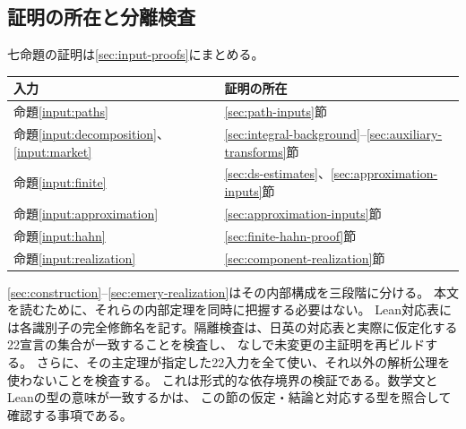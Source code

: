 \subsection{証明の所在と分離検査}
七命題の証明は\ref{sec:input-proofs}にまとめる。
\begin{center}\small
\begin{tabular}{ll}
\toprule 入力 & 証明の所在\\\midrule
命題\ref{input:paths} & \ref{sec:path-inputs}節\\
命題\ref{input:decomposition}、\ref{input:market} & \ref{sec:integral-background}--\ref{sec:auxiliary-transforms}節\\
命題\ref{input:finite} & \ref{sec:ds-estimates}、\ref{sec:approximation-inputs}節\\
命題\ref{input:approximation} & \ref{sec:approximation-inputs}節\\
命題\ref{input:hahn} & \ref{sec:finite-hahn-proof}節\\
命題\ref{input:realization} & \ref{sec:component-realization}節\\\bottomrule
\end{tabular}\end{center}
\ref{sec:construction}--\ref{sec:emery-realization}はその内部構成を三段階に分ける。
本文を読むために、それらの内部定理を同時に把握する必要はない。
Lean対応表には各識別子の完全修飾名を記す。隔離検査は、日英の対応表と実際に仮定化する
22宣言の集合が一致することを検査し、 なしで未変更の主証明を再ビルドする。
さらに、その主定理が指定した22入力を全て使い、それ以外の解析公理を使わないことを検査する。
これは形式的な依存境界の検証である。数学文とLeanの型の意味が一致するかは、
この節の仮定・結論と対応する型を照合して確認する事項である。
